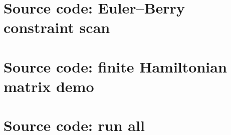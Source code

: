\documentclass[11pt,a4paper]{article}
\begin{document}
\section{Source code: Euler--Berry constraint scan}


\section{Source code: finite Hamiltonian matrix demo}


\section{Source code: run all}

\end{document}
